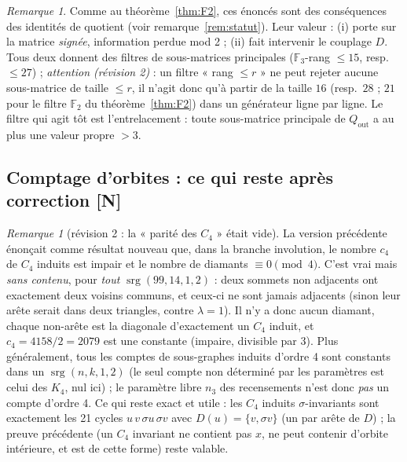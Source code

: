 \documentclass[11pt,a4paper]{article}
\theoremstyle{definition}
\theoremstyle{remark}
\newtheorem{remark}[theorem]{Remarque}
\newcommand{\F}{\mathbb{F}}
\newcommand{\srg}{\operatorname{srg}}
\newcommand{\Qout}{Q_{\mathrm{out}}}
\newcommand{\st}[1]{\textbf{[#1]}}
\begin{document}
\begin{remark}
Comme au théorème~\ref{thm:F2}, ces énoncés sont des conséquences des identités de quotient (voir remarque~\ref{rem:statut}). Leur valeur : (i) porte sur la matrice \emph{signée}, information perdue mod 2 ; (ii) fait intervenir le couplage $D$. Tous deux donnent des filtres de sous-matrices principales ($\F_3$-rang $\le15$, resp.\ $\le27$) ; \emph{attention (révision 2)} : un filtre « rang $\le r$ » ne peut
rejeter aucune sous-matrice de taille $\le r$, il n'agit donc qu'à partir de la taille $16$ (resp.\ $28$ ; $21$ pour le filtre $\F_2$ du théorème~\ref{thm:F2}) dans un générateur ligne par ligne.
Le filtre qui agit tôt est l'entrelacement : toute sous-matrice principale de $\Qout$ a au plus une valeur propre $>3$.
\end{remark}

\subsection{Comptage d'orbites : ce qui reste après correction \st{N}}
\begin{remark}[révision 2 : la « parité des $C_4$ » était vide]\label{rem:c4}
La version précédente énonçait comme résultat nouveau que, dans la branche involution, le nombre $c_4$ de $C_4$ induits est impair et le nombre de diamants $\equiv0\pmod4$.
C'est vrai mais \emph{sans contenu}, pour \emph{tout} $\srg(99,14,1,2)$ : deux sommets non adjacents ont exactement deux voisins communs, et ceux-ci ne sont jamais adjacents
(sinon leur arête serait dans deux triangles, contre $\lambda=1$). Il n'y a donc aucun diamant, chaque non-arête est la diagonale d'exactement un $C_4$ induit, et
$c_4=4158/2=2079$ est une constante (impaire, divisible par 3). Plus généralement, tous les comptes de sous-graphes induits d'ordre 4 sont constants dans un
$\srg(n,k,1,2)$ (le seul compte non déterminé par les paramètres est celui des $K_4$, nul ici) ; le paramètre libre $n_3$ des recensements n'est donc \emph{pas}
un compte d'ordre 4.
Ce qui reste exact et utile : les $C_4$ induits $\sigma$-invariants sont exactement les 21 cycles $u\,v\,\sigma u\,\sigma v$ avec $D(u)=\{v,\sigma v\}$ (un par arête de $D$) ;
la preuve précédente (un $C_4$ invariant ne contient pas $x$, ne peut contenir d'orbite intérieure, et est de cette forme) reste valable.
\end{remark}
\end{document}
